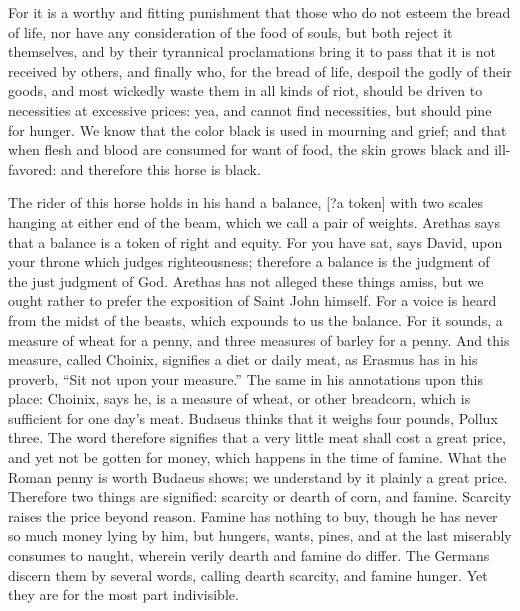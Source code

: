 For it is a worthy and fitting punishment that those who do not esteem the bread of life, nor have any consideration of the food of souls, but both reject it themselves, and by their tyrannical proclamations bring it to pass that it is not received by others, and finally who, for the bread of life, despoil the godly of their goods, and most wickedly waste them in all kinds of riot, should be driven to necessities at excessive prices: yea, and cannot find necessities, but should pine for hunger. We know that the color black is used in mourning and grief; and that when flesh and blood are consumed for want of food, the skin grows black and ill-favored: and therefore this horse is black.

The rider of this horse holds in his hand a balance, [?a token] with two scales hanging at either end of the beam, which we call a pair of weights. Arethas says that a balance is a token of right and equity. For you have sat, says David, upon your throne which judges righteousness; therefore a balance is the judgment of the just judgment of God. Arethas has not alleged these things amiss, but we ought rather to prefer the exposition of Saint John himself. For a voice is heard from the midst of the beasts, which expounds to us the balance. For it sounds, a measure of wheat for a penny, and three measures of barley for a penny. And this measure, called Choinix, signifies a diet or daily meat, as Erasmus has in his proverb, “Sit not upon your measure.” The same in his annotations upon this place: Choinix, says he, is a measure of wheat, or other breadcorn, which is sufficient for one day’s meat. Budaeus thinks that it weighs four pounds, Pollux three. The word therefore signifies that a very little meat shall cost a great price, and yet not be gotten for money, which happens in the time of famine. What the Roman penny is worth Budaeus shows; we understand by it plainly a great price. Therefore two things are signified: scarcity or dearth of corn, and famine. Scarcity raises the price beyond reason. Famine has nothing to buy, though he has never so much money lying by him, but hungers, wants, pines, and at the last miserably consumes to naught, wherein verily dearth and famine do differ. The Germans discern them by several words, calling dearth scarcity, and famine hunger. Yet they are for the most part indivisible.


